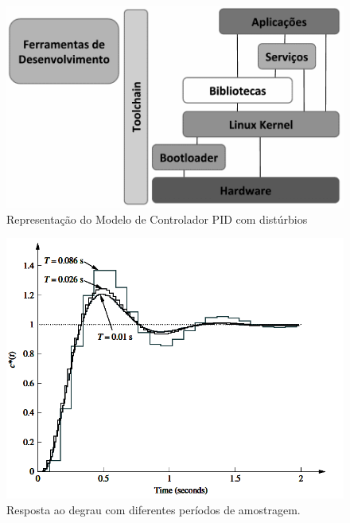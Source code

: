 \begin{figure}[htb]
  \caption{Representação do Modelo de Controlador PID com distúrbios}
  \begin{center}
      \includegraphics[scale=0.35]{img/sistema-linux-overview_embarcados}
  \end{center}
  \label{fig:sistema-linux-overview_embarcados}
\end{figure}

\begin{figure}[htb]
  \caption{Resposta ao degrau com diferentes períodos de amostragem.}
  \begin{center}
      \includegraphics[scale=0.65]{img/nise_digitalinput_p761}
  \end{center}
  \label{fig:nise_digitalinput_p761}
\end{figure}

